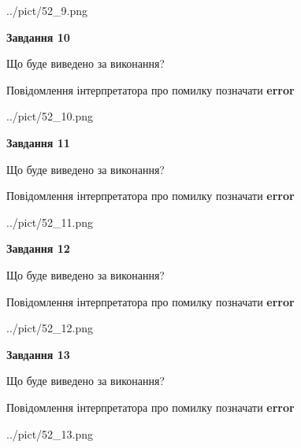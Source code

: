 \documentclass[11pt, ukrainian]{article}
\begin{document}
{\begin {large}
\begin{center}
	{../pict/52_9.png}
\end{center}
\newpage

{\begin {center}\textbf{Завдання 10}\end {center}}\par
Що буде виведено за виконання? \par
Повідомлення інтерпретатора про помилку позначати \textbf{error}

\begin{center}
	{../pict/52_10.png}
\end{center}
\newpage

{\begin {center}\textbf{Завдання 11}\end {center}}\par
Що буде виведено за виконання? \par
Повідомлення інтерпретатора про помилку позначати \textbf{error}

\begin{center}
	{../pict/52_11.png}
\end{center}
\newpage

{\begin {center}\textbf{Завдання 12}\end {center}}\par
Що буде виведено за виконання? \par
Повідомлення інтерпретатора про помилку позначати \textbf{error}

\begin{center}
	{../pict/52_12.png}
\end{center}
\newpage

{\begin {center}\textbf{Завдання 13}\end {center}}\par
Що буде виведено за виконання? \par
Повідомлення інтерпретатора про помилку позначати \textbf{error}

\begin{center}
	{../pict/52_13.png}
\end{center}
\newpage


\end{large}}
\end{document}
